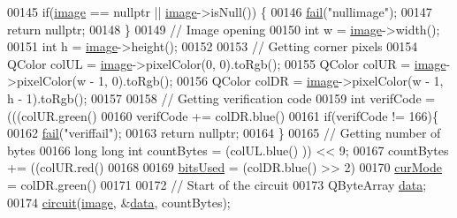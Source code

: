 \begin{DoxyCode}
00145     \textcolor{keywordflow}{if}(\mbox{\hyperlink{namespacetests-setup_ad55b685280f549e15688a94cbb89f512}{image}} == \textcolor{keyword}{nullptr} || \mbox{\hyperlink{namespacetests-setup_ad55b685280f549e15688a94cbb89f512}{image}}->isNull()) \{
00146         \mbox{\hyperlink{class_model_p_c_a47464b59b7e37fcee25e55475708aabd}{fail}}(\textcolor{stringliteral}{"nullimage"});
00147         \textcolor{keywordflow}{return} \textcolor{keyword}{nullptr};
00148     \}
00149     \textcolor{comment}{// Image opening}
00150     \textcolor{keywordtype}{int} w = \mbox{\hyperlink{namespacetests-setup_ad55b685280f549e15688a94cbb89f512}{image}}->width();
00151     \textcolor{keywordtype}{int} h = \mbox{\hyperlink{namespacetests-setup_ad55b685280f549e15688a94cbb89f512}{image}}->height();
00152 
00153     \textcolor{comment}{// Getting corner pixels}
00154     QColor colUL = \mbox{\hyperlink{namespacetests-setup_ad55b685280f549e15688a94cbb89f512}{image}}->pixelColor(0, 0).toRgb();
00155     QColor colUR = \mbox{\hyperlink{namespacetests-setup_ad55b685280f549e15688a94cbb89f512}{image}}->pixelColor(w - 1, 0).toRgb();
00156     QColor colDR = \mbox{\hyperlink{namespacetests-setup_ad55b685280f549e15688a94cbb89f512}{image}}->pixelColor(w - 1, h - 1).toRgb();
00157 
00158     \textcolor{comment}{// Getting verification code}
00159     \textcolor{keywordtype}{int} verifCode = (((colUR.green() %
00160     verifCode += colDR.blue() %
00161     \textcolor{keywordflow}{if}(verifCode != 166)\{
00162         \mbox{\hyperlink{class_model_p_c_a47464b59b7e37fcee25e55475708aabd}{fail}}(\textcolor{stringliteral}{"veriffail"});
00163         \textcolor{keywordflow}{return} \textcolor{keyword}{nullptr};
00164     \}
00165     \textcolor{comment}{// Getting number of bytes}
00166     \textcolor{keywordtype}{long} \textcolor{keywordtype}{long} \textcolor{keywordtype}{int} countBytes = (colUL.blue() %
      )) << 9;
00167     countBytes += ((colUR.red() %
00168 
00169     \mbox{\hyperlink{class_model_p_c_a655deb6a8afa94c7f4aadb3056989038}{bitsUsed}} = (colDR.blue() >> 2) %
00170     \mbox{\hyperlink{class_model_p_c_ad74974ac236182c1d6d2cf0729fac3dd}{curMode}} = colDR.green() %
00171 
00172     \textcolor{comment}{// Start of the circuit}
00173     QByteArray \mbox{\hyperlink{namespace_errors_dict_setup_af570460846fb9f0c91abd308a095dcdc}{data}};
00174     \mbox{\hyperlink{class_model_p_c_a1d0091062a0c836b283ec2f67411623b}{circuit}}(\mbox{\hyperlink{namespacetests-setup_ad55b685280f549e15688a94cbb89f512}{image}}, &\mbox{\hyperlink{namespace_errors_dict_setup_af570460846fb9f0c91abd308a095dcdc}{data}}, countBytes);

\end{DoxyCode}
